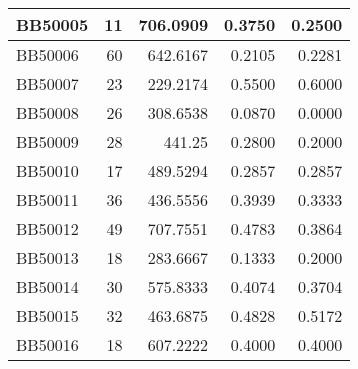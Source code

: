 \begin{longtable}{|l|r|r||r|r|}
	\hline
	BB50005 & 11    & 706.0909 & 0.3750 & 0.2500 \\
	\hline
	BB50006 & 60    & 642.6167 & 0.2105 & 0.2281 \\
	\hline
	BB50007 & 23    & 229.2174 & 0.5500 & 0.6000 \\
	\hline
	BB50008 & 26    & 308.6538 & 0.0870 & 0.0000 \\
	\hline
	BB50009 & 28    & 441.25 & 0.2800 & 0.2000 \\
	\hline
	BB50010 & 17    & 489.5294 & 0.2857 & 0.2857 \\
	\hline
	BB50011 & 36    & 436.5556 & 0.3939 & 0.3333 \\
	\hline
	BB50012 & 49    & 707.7551 & 0.4783 & 0.3864 \\
	\hline
	BB50013 & 18    & 283.6667 & 0.1333 & 0.2000 \\
	\hline
	BB50014 & 30    & 575.8333 & 0.4074 & 0.3704 \\
	\hline
	BB50015 & 32    & 463.6875 & 0.4828 & 0.5172 \\
	\hline
	BB50016 & 18    & 607.2222 & 0.4000 & 0.4000 \\
	\hline
	
\end{longtable}%





